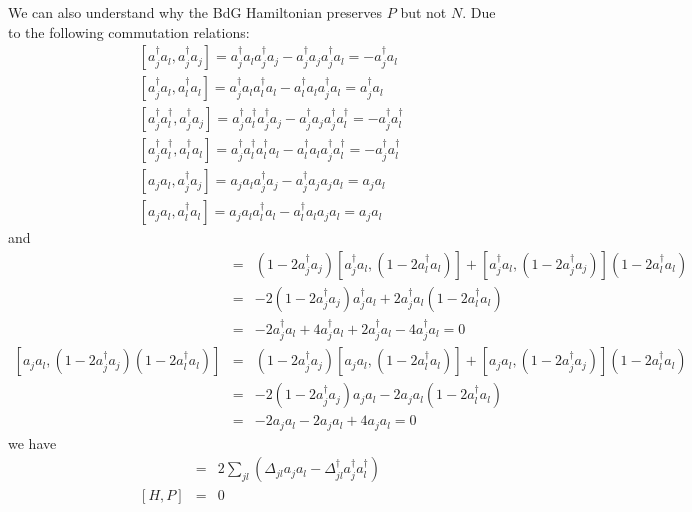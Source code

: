We can also understand why the BdG Hamiltonian preserves $P$ but not $N$. Due to the following commutation relations:
\begin{eqnarray}
	&&[a_j^\dag a_{l}, a_j^\dag a_j ] = a_j^\dag a_{l} a_j^\dag a_j - a_j^\dag a_j a_j^\dag a_{l} = - a_j^\dag a_l\\\nonumber
	&&[a_j^\dag a_{l}, a_l^\dag a_l ] = a_j^\dag a_{l} a_l^\dag a_l - a_l^\dag a_l a_j^\dag a_{l} = a_j^\dag a_l\\\nonumber
	&&[a_j^\dag a^\dag_{l}, a_j^\dag a_j ] = a_j^\dag a^\dag_{l} a_j^\dag a_j - a_j^\dag a_j a_j^\dag a^\dag_{l} = - a_j^\dag a_l^\dag\\\nonumber
	&&[a_j^\dag a^\dag_{l}, a_l^\dag a_l ] = a_j^\dag a^\dag_{l} a_l^\dag a_l - a_l^\dag a_l a_j^\dag a^\dag_{l} = - a_j^\dag a_l^\dag\\\nonumber
	&&[a_j a_l, a_j^\dag a_j ] = a_j a_{l} a_j^\dag a_j - a_j^\dag a_j a_j a_{l} =  a_j a_l\\\nonumber
	&&[a_j a_{l}, a_l^\dag a_l ] = a_j a_{l} a_l^\dag a_l - a_l^\dag a_l a_j a_{l} = a_j a_l
\end{eqnarray}
and
\begin{eqnarray*}
	[a_j^\dag a_{l}, (1-2a_j^\dag a_j)(1-2a_l^\dag a_l) ] &=& (1-2a_j^\dag a_j)[a_j^\dag a_{l}, (1-2a_l^\dag a_l) ] + 	[a_j^\dag a_{l}, (1-2a_j^\dag a_j)](1-2a_l^\dag a_l) \\\nonumber
	&=& -2(1-2a_j^\dag a_j)a_j^\dag a_l + 2a_j^\dag a_l (1-2a_l^\dag a_l) \\\nonumber
	&=& -2 a_j^\dag a_l + 4 a_j^\dag a_l +  2 a_j^\dag a_l - 4 a_j^\dag a_l = 0 \\\nonumber
	[a_j a_{l}, (1-2a_j^\dag a_j)(1-2a_l^\dag a_l) ] &=& (1-2a_j^\dag a_j)[a_j a_{l}, (1-2a_l^\dag a_l) ] + 	[a_j a_{l}, (1-2a_j^\dag a_j)](1-2a_l^\dag a_l) \\\nonumber
	&=& -2(1-2a_j^\dag a_j)a_j a_l - 2a_j a_l (1-2a_l^\dag a_l) \\\nonumber
	&=& -2 a_j a_l -  2 a_j a_l + 4 a_j a_l =0
\end{eqnarray*}
we have
\begin{eqnarray}
	[H, N] &=& 2\sum_{jl} (\Delta_{jl} a_j a_l - \Delta^\dag_{jl} a_j^\dag a_l^\dag ) \\\nonumber
	[H, P] &=& 0
\end{eqnarray}


